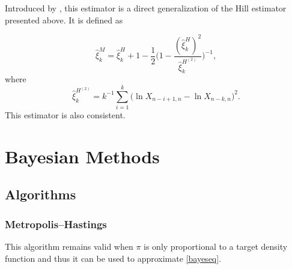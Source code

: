Introduced by \cite{dekkers_moment_1989}, this estimator is a direct generalization of the Hill estimator presented above. It is defined as

\begin{equation}
\hat{\xi}^M_k=\hat{\xi}_k^H+1-\frac{1}{2}\Bigg(1-\frac{(\hat{\xi}_k^H)^2}{\hat{\xi}^{H^{(2)}}_k }\Bigg)^{-1},
\end{equation}
where
\begin{equation*}
\hat{\xi}^{H^{(2)}}_k=k^{-1}\sum_{i=1}^k\big(\ln X_{n-i+1,n}-\ln X_{n-k,n}\big)^2.
\end{equation*}
This estimator is also consistent.  





\chapter{Bayesian Methods}\label{appB}

\section{Algorithms}\label{app:algo}

\subsection{Metropolis–Hastings}\label{app:mh}

This algorithm remains valid when $\pi$ is only proportional to a target density function and thus it can be used to approximate \ref{bayeseq}. 

